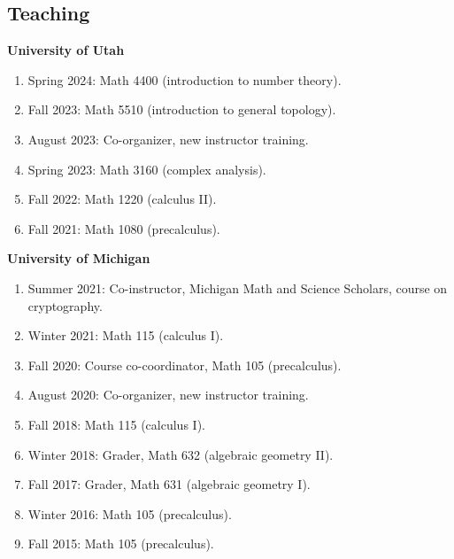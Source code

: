\documentclass{res}
\begin{document}
\begin{resume}
\section{Teaching}
{\bf University of Utah}
\begin{enumerate}
\item Spring 2024: Math 4400 (introduction to number theory).
\item Fall 2023: Math 5510 (introduction to general topology).
\item August 2023: Co-organizer, new instructor training.
\item Spring 2023: Math 3160 (complex analysis).
\item Fall 2022: Math 1220 (calculus II).
\item Fall 2021: Math 1080 (precalculus).
\end{enumerate}
{\bf University of Michigan}
\begin{enumerate}
\item Summer 2021: Co-instructor, Michigan Math and Science Scholars, course on cryptography.
\item Winter 2021: Math 115 (calculus I).
\item Fall 2020: Course co-coordinator, Math 105 (precalculus).
\item August 2020: Co-organizer, new instructor training.
\item Fall 2018: Math 115 (calculus I).
\item Winter 2018: Grader, Math 632 (algebraic geometry II).
\item Fall 2017: Grader, Math 631 (algebraic geometry I).
\item Winter 2016: Math 105 (precalculus).
\item Fall 2015: Math 105 (precalculus).
\end{enumerate}


\end{resume}
\end{document}
